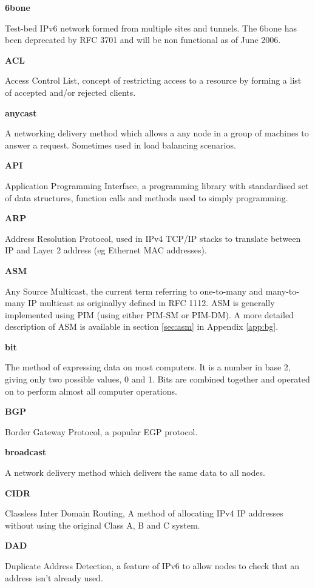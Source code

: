 \textbf{6bone}

Test-bed IPv6 network formed from multiple sites and tunnels. The 6bone
has been deprecated by RFC 3701 and will be non functional as of June
2006.

\textbf{ACL}

Access Control List, concept of restricting access to a resource by
forming a list of accepted and/or rejected clients.

\textbf{anycast}

A networking delivery method which allows a any node in a group of 
machines to answer a request. Sometimes used in load balancing 
scenarios.

\textbf{API}

Application Programming Interface, a programming library with
standardised set of data structures, function calls and methods used to
simply programming.

\textbf{ARP}

Address Resolution Protocol, used in IPv4 TCP/IP stacks to translate 
between IP and Layer 2 address (eg Ethernet MAC addresses).

\textbf{ASM}

Any Source Multicast, the current term referring to one-to-many and
many-to-many IP multicast as originallyy defined in RFC 1112. ASM is 
generally implemented using PIM (using either PIM-SM or PIM-DM). A more 
detailed description of ASM is available in section \ref{sec:asm} in 
Appendix \ref{app:bg}.

\textbf{bit}

The method of expressing data on most computers. It is a number in base
2, giving only two possible values, 0 and 1. Bits are combined together
and operated on to perform almost all computer operations.

\textbf{BGP}

Border Gateway Protocol, a popular EGP protocol.  

\textbf{broadcast}

A network delivery method which delivers the same data to all nodes.

\textbf{CIDR}

Classless Inter Domain Routing, A method of allocating IPv4 IP addresses
without using the original Class A, B and C system.

\textbf{DAD}

Duplicate Address Detection, a feature of IPv6 to allow nodes to check
that an address isn't already used.

